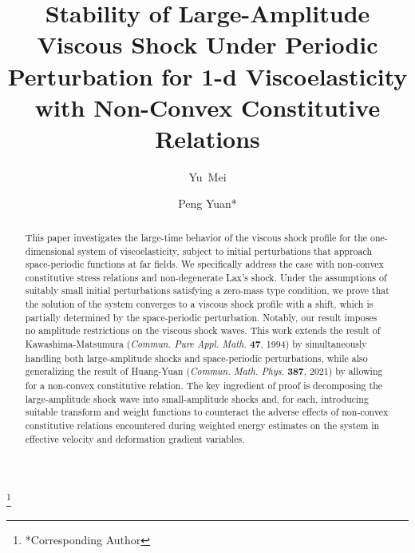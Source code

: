 \documentclass[12pt,reqno]{amsart}
\date{}
\numberwithin{equation}{section}
\begin{document}
	

\title[viscoelasticity with non-convexity under periodic perturbations]{Stability of Large-Amplitude Viscous Shock Under Periodic Perturbation for 1-d Viscoelasticity with Non-Convex Constitutive Relations}
	
	\author{Yu~Mei}
	\address[Yu Mei]{School of Mathematics and Statistics, Northwestern Polytechnical University, Xi'an 710129, China}
	
	\author{Peng Yuan*}
	\thanks{*Corresponding Author}
	\address[Peng Yuan]{School of Mathematics and Statistics, Northwestern Polytechnical University, Xi'an 710129, China}
	
	


\maketitle
\begin{abstract}
	This paper investigates the large-time behavior of the viscous shock profile for the one-dimensional system of viscoelasticity, subject to initial perturbations that approach space-periodic functions at far fields. We specifically address the case with non-convex constitutive stress relations and non-degenerate Lax's shock. Under the assumptions of suitably small initial perturbations satisfying a zero-mass type condition, we prove that the solution of the system converges to a viscous shock profile with a shift, which is partially determined by the space-periodic perturbation. Notably, our result imposes no amplitude restrictions on the viscous shock waves.  This work extends the result of Kawashima-Matsumura (\textit{Commun. Pure Appl. Math.} \textbf{47}, 1994) by simultaneously handling both large-amplitude shocks and space-periodic perturbations, while also generalizing the result of Huang-Yuan (\textit{Commun. Math. Phys.} \textbf{387}, 2021) by allowing for a non-convex constitutive relation. The key ingredient of proof is decomposing the large-amplitude shock wave into small-amplitude shocks and, for each, introducing suitable transform and weight functions to counteract the adverse effects of non-convex constitutive relations encountered during weighted energy estimates on the system in effective velocity and deformation gradient variables.
\end{abstract}
\end{document}
